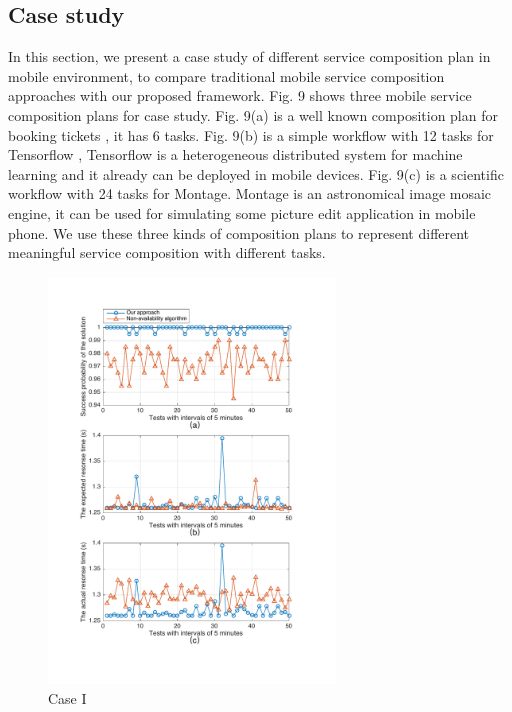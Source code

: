 \documentclass[10pt,journal,compsoc]{IEEEtran}
\begin{document}
\subsection{Case study}



In this section, we present a case study of different service composition plan in mobile environment, to compare traditional mobile service composition approaches with our proposed framework. Fig. 9 shows three mobile service composition plans for case study. Fig. 9(a) is a well known composition plan for booking tickets \cite{wu2013transactional}, it has 6 tasks. Fig. 9(b) is a simple workflow with 12 tasks for Tensorflow \cite{abadi2016tensorflow}, Tensorflow is a heterogeneous distributed system for machine learning and it already can be deployed in mobile devices. Fig. 9(c) is a scientific workflow with 24 tasks for Montage. Montage is an astronomical image mosaic engine, it can be used for simulating some picture edit application in mobile phone. We use these three kinds of composition plans to represent different meaningful service composition with different tasks.





\begin{figure}[!t]
\centering
\includegraphics[width=3in]{./img/Task-6.pdf}
\caption{Case I}
\label{Task-6}
\end{figure}
\end{document}
